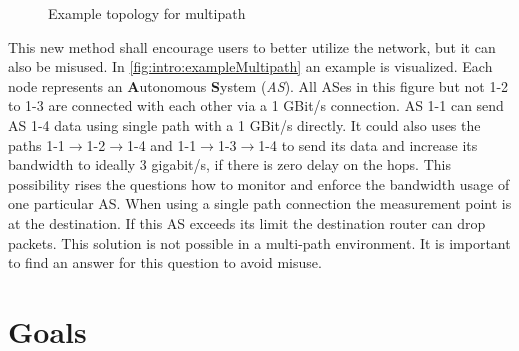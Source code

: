 \documentclass[thesis.tex]{subfiles}
\begin{document}
\begin{figure}[h]
    \centering
    \caption{Example topology for multipath}
    \label{fig:intro:exampleMultipath}
\end{figure}

This new method shall encourage users to better utilize the network, but it can also be misused. In \autoref{fig:intro:exampleMultipath} an example is visualized. Each node represents an \textbf{A}utonomous \textbf{S}ystem (\textit{AS}). All ASes in this figure but not 1-2 to 1-3 are connected with each other via a 1 GBit/s connection. AS 1-1 can send AS 1-4 data using single path with a 1 GBit/s directly. It could also uses the paths 1-1$\rightarrow$1-2$\rightarrow$1-4 and 1-1$\rightarrow$1-3$\rightarrow$1-4 to send its data and increase its bandwidth to ideally 3 gigabit/s, if there is zero delay on the hops. This possibility rises the questions how to monitor and enforce the bandwidth usage of one particular AS. When using a single path connection the measurement point is at the destination. If this AS exceeds its limit the destination router can drop packets. This solution is not possible in a multi-path environment. It is important to find an answer for this question to avoid misuse.

\section{Goals} \label{sec:intro:goals}
\end{document}

